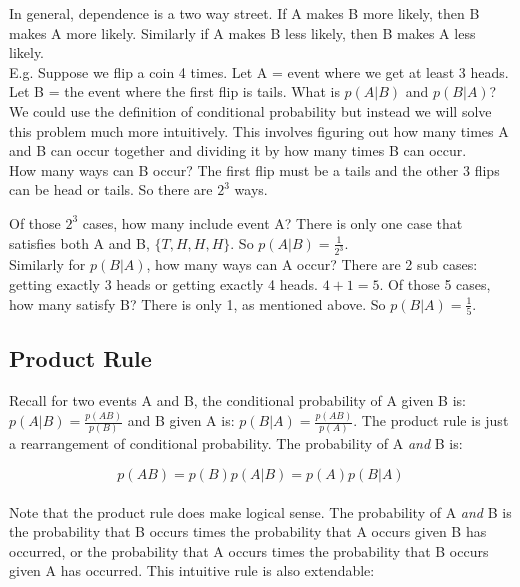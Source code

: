 \documentclass[12pt, letterpaper]{article}
\begin{document}
In general, dependence is a two way street. If A makes B more likely, then B makes A more likely. Similarly if A makes B less likely, then B makes A less likely.\\

E.g. Suppose we flip a coin 4 times. Let A = event where we get at least 3 heads. Let B = the event where the first flip is tails. What is \(p\left(A|B\right)\) and \(p\left(B|A\right)\)?\\

We could use the definition of conditional probability but instead we will solve this problem much more intuitively. This involves figuring out how many times A and B can occur together and dividing it by how many times B can occur.\\

How many ways can B occur? The first flip must be a tails and the other 3 flips can be head or tails. So there are \(2^3\) ways. 

Of those \(2^3\) cases, how many include event A? There is only one case that satisfies both A and B, \(\{T, H, H, H\}\). So \(p\left(A|B\right) = \frac{1}{2^3}\).\\

Similarly for \(p\left(B|A\right)\), how many ways can A occur? There are 2 sub cases: getting exactly 3 heads or getting exactly 4 heads. \(4 + 1 = 5\). Of those 5 cases, how many satisfy B? There is only 1, as mentioned above. So \(p\left(B|A\right) = \frac{1}{5}\).

\subsection{Product Rule}
Recall for two events A and B, the conditional probability of A given B is:
\(p\left(A|B\right) = \frac{p\left(AB\right)}{p\left(B\right)}\) and B given A is: \(p\left(B|A\right) = \frac{p\left(AB\right)}{p\left(A\right)}\). The product rule is just a rearrangement of conditional probability. The probability of A \emph{and} B is:

\begin{equation}
p\left(AB\right) = p\left(B\right)p\left(A|B\right) = p\left(A\right)p\left(B|A\right)
\end{equation}\\

Note that the product rule does make logical sense. The probability of A \emph{and} B is the probability that B occurs times the probability that A occurs given B has occurred, or the probability that A occurs times the probability that B occurs given A has occurred. This intuitive rule is also extendable:
\end{document}
